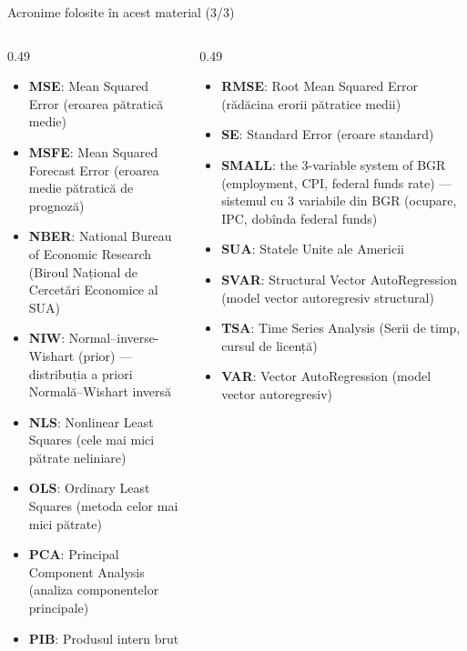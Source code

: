 \begin{frame}{Acronime folosite în acest material (3/3)}
\begin{columns}[T]
\begin{column}{0.49\textwidth}
\begin{itemize}\setlength{\itemsep}{0pt}
    \item \textbf{MSE}: Mean Squared Error (eroarea pătratică medie)
    \item \textbf{MSFE}: Mean Squared Forecast Error (eroarea medie pătratică de prognoză)
    \item \textbf{NBER}: National Bureau of Economic Research (Biroul Național de Cercetări Economice al SUA)
    \item \textbf{NIW}: Normal–inverse-Wishart (prior) — distribuția a priori Normală–Wishart inversă
    \item \textbf{NLS}: Nonlinear Least Squares (cele mai mici pătrate neliniare)
    \item \textbf{OLS}: Ordinary Least Squares (metoda celor mai mici pătrate)
    \item \textbf{PCA}: Principal Component Analysis (analiza componentelor principale)
    \item \textbf{PIB}: Produsul intern brut
\end{itemize}
\end{column}
\begin{column}{0.49\textwidth}
\begin{itemize}\setlength{\itemsep}{0pt}
    \item \textbf{RMSE}: Root Mean Squared Error (rădăcina erorii pătratice medii)
    \item \textbf{SE}: Standard Error (eroare standard)
    \item \textbf{SMALL}: the 3-variable system of BGR (employment, CPI, federal funds rate) — sistemul cu 3 variabile din BGR (ocupare, IPC, dobînda federal funds)
    \item \textbf{SUA}: Statele Unite ale Americii
    \item \textbf{SVAR}: Structural Vector AutoRegression (model vector autoregresiv structural)
    \item \textbf{TSA}: Time Series Analysis (Serii de timp, cursul de licență)
    \item \textbf{VAR}: Vector AutoRegression (model vector autoregresiv)
\end{itemize}
\end{column}
\end{columns}
\end{frame}

